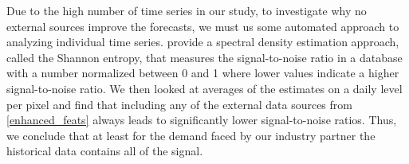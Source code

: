 Due to the high number of time series in our study, to investigate why
    no external sources improve the forecasts, we must us some automated
    approach to analyzing individual time series.
\cite{barbour2014} provide a spectral density estimation approach, called
    the Shannon entropy, that measures the signal-to-noise ratio in a
    database with a number normalized between 0 and 1 where lower values
    indicate a higher signal-to-noise ratio.
We then looked at averages of the estimates on a daily level per pixel and
    find that including any of the external data sources from
    \ref{enhanced_feats} always leads to significantly lower signal-to-noise
    ratios.
Thus, we conclude that at least for the demand faced by our industry partner
    the historical data contains all of the signal.
